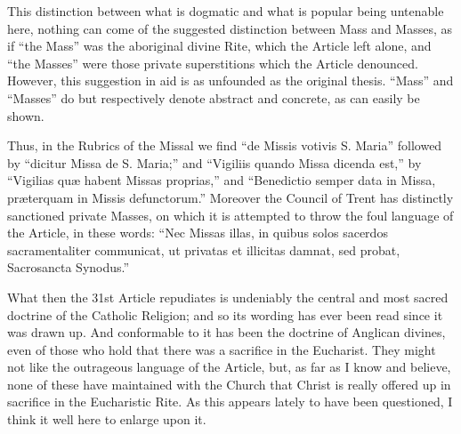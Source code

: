 This distinction between what is dogmatic and what is popular being
untenable here, nothing can come of the suggested distinction between
Mass and Masses, as if ``the Mass'' was the aboriginal divine
Rite, which the Article left alone, and ``the Masses'' were
those private superstitions which the Article denounced. However, this
suggestion in aid is as unfounded as the original thesis.
``Mass'' and ``Masses'' do but respectively denote
abstract and concrete, as can easily be shown.

Thus, in the Rubrics of the Missal we find ``de Missis votivis
S. Maria'' followed by ``dicitur Missa de S. Maria;'' and
``Vigiliis quando Missa dicenda est,'' by ``Vigilias quæ
habent Missas proprias,'' and ``Benedictio semper data in
Missa, præterquam in Missis defunctorum.'' Moreover the Council
of Trent has distinctly sanctioned private Masses, on which it is
attempted to throw the foul language of the Article, in these words:
``Nec Missas illas, in quibus solos sacerdos sacramentaliter
communicat, ut privatas et illicitas damnat, sed probat, Sacrosancta
Synodus.''

What then the 31st Article repudiates is undeniably the central and
most sacred doctrine of the Catholic Religion; and so its wording has
ever been read since it was drawn up. And conformable to it has been
the doctrine of Anglican divines, even of those who hold that there
was a sacrifice in the Eucharist. They might not like the outrageous
language of the Article, but, as far as I know and believe, none of
these have maintained with the Church that Christ is really offered up
in sacrifice in the Eucharistic Rite. As this appears lately to have
been questioned, I think it well here to enlarge upon it.

